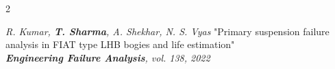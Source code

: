 \documentclass[10pt,a4paper,withhyper]{altacv}
\begin{document}
\begin{paracol}{2}





\switchcolumn



\printinfo{\faFile*[regular]} \emph{R. Kumar, \textbf{T. Sharma}, A. Shekhar, N. S. Vyas}
\noindent "Primary suspension failure analysis in FIAT type LHB bogies and life estimation"\\
\textit{\textbf{Engineering Failure Analysis}, vol. 138, 2022}\\



\end{paracol}
\end{document}
